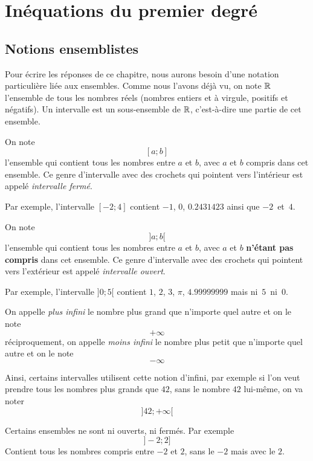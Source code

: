 \chapter{Inéquations du premier degré}

\section{Notions ensemblistes}

Pour écrire les réponses de ce chapitre, nous aurons besoin d'une notation particulière liée aux ensembles. Comme nous l'avons déjà vu, on note $\mathbb{R}$ l'ensemble de tous les nombres réels (nombres entiers et à virgule, positifs et négatifs). Un intervalle est un sous-ensemble de $\mathbb{R}$, c'est-à-dire une partie de cet ensemble.

\begin{definition}
On note 
$$
[a;b]
$$
l'ensemble qui contient tous les nombres entre $a$ et $b$, avec $a$ et $b$ compris dans cet ensemble. Ce genre d'intervalle avec des crochets qui pointent vers l'intérieur est appelé \emph{intervalle fermé}.
\end{definition}

Par exemple, l'intervalle $[-2;4]$ contient $-1$, $0$, $0.2431423$ ainsi que $-2$~et~$4$. 

\begin{definition}
On note 
$$
]a;b[
$$
l'ensemble qui contient tous les nombres entre $a$ et $b$, avec $a$ et $b$ \textbf{n'étant pas compris} dans cet ensemble. Ce genre d'intervalle avec des crochets qui pointent vers l'extérieur est appelé \emph{intervalle ouvert}.
\end{definition}

Par exemple, l'intervalle $]0;5[$ contient $1$, $2$, $3$, $\pi$, $4.99999999$ mais ni~$5$~ni~$0$. 

\begin{definition}
On appelle \emph{plus infini} le nombre plus grand que n'importe quel autre et on le note
$$
+\infty
$$
réciproquement, on appelle \emph{moins infini} le nombre plus petit que n'importe quel autre et on le note
$$
-\infty
$$
\end{definition}

Ainsi, certains intervalles utilisent cette notion d'infini, par exemple si l'on veut prendre tous les nombres plus grands que $42$, sans le nombre $42$ lui-même, on va noter
$$
]42;+\infty[
$$

\begin{remarque}
Certains ensembles ne sont ni ouverts, ni fermés. Par exemple
$$
]-2;2]
$$
Contient tous les nombres compris entre $-2$ et $2$, sans le $-2$ mais avec le $2$.
\end{remarque}

